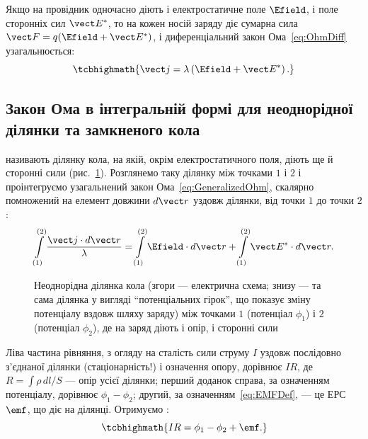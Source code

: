 Якщо на провідник одночасно діють і електростатичне поле $\Efield$, і поле сторонніх сил $\vect E^*$, то на кожен носій заряду діє
сумарна сила $\vect F = q(\Efield + \vect E^*)$, і диференціальний закон Ома~\eqref{eq:OhmDiff} узагальнюється:
\begin{equation}\label{eq:GeneralizedOhm}
	\tcbhighmath{
		\vect j = \lambda\left(\Efield + \vect E^*\right).
	}
\end{equation}

\subsection*{Закон Ома в інтегральній формі для неоднорідної ділянки та замкненого кола}

 називають ділянку кола, на якій, окрім електростатичного поля, діють ще й сторонні сили (рис.~\ref{pic:OhmLaw}). Розглянемо
таку ділянку між точками $1$ і $2$ і проінтегруємо узагальнений закон Ома~\eqref{eq:GeneralizedOhm}, скалярно помножений на елемент довжини $d\vect
r$ уздовж ділянки, від точки $1$ до точки $2$:
\begin{equation*}
	\int\limits_{(1)}^{(2)} \frac{\vect j\cdot d\vect r}{\lambda} = \int\limits_{(1)}^{(2)} \Efield\cdot d\vect r + \int\limits_{(1)}^{(2)} \vect
	E^*\cdot d\vect r.
\end{equation*}

\begin{figure}\centering
    \caption{Неоднорідна ділянка кола (згори --- електрична схема; знизу --- та сама ділянка у вигляді
    \enquote{потенціальних гірок}, що показує зміну потенціалу вздовж шляху заряду) між точками $1$ (потенціал $\phi_1$) і $2$
    (потенціал $\phi_2$), де на заряд діють і опір, і сторонні сили\label{pic:OhmLaw}}
\end{figure}

Ліва частина рівняння, з огляду на сталість сили струму $I$ уздовж послідовно з'єднаної ділянки (стаціонарність!) і означення опору, дорівнює $IR$, де
$R = \int \rho\, dl/S$ --- опір усієї ділянки; перший доданок справа, за означенням потенціалу, дорівнює $\phi_1 - \phi_2$; другий, за
означенням~\eqref{eq:EMFDef}, --- це ЕРС $\emf$, що діє на ділянці. Отримуємо :
\begin{equation}\label{eq:OhmNonUniform}
	\tcbhighmath{
		IR = \phi_1 - \phi_2 + \emf.
	}
\end{equation}

